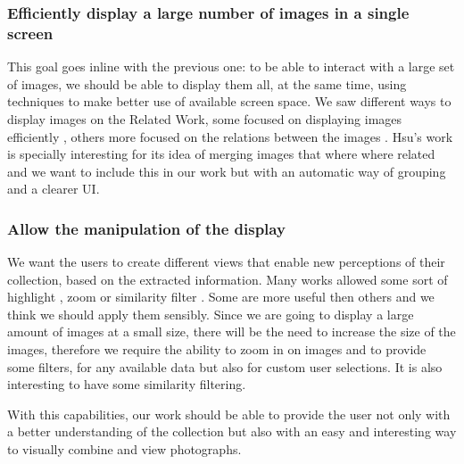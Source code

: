 \subsubsection{Efficiently display a large number of images in a single screen} %
This goal goes inline with the previous one: to be able to interact with a large set of images, we should be able to display them all, at the same time, using techniques to make better use of available screen space. We saw different ways to display images on the Related Work, some focused on displaying images efficiently \cite{Qiu:2007p1207,Rodden:2001p731,Naaman:2004p1802,Hsu:2009p2696,Bederson:2001:PZI:502348.502359}, others more focused on the relations between the images \cite{Girgensohn:2009:MOP:1502650.1502711,Heesch:2004p2675}. Hsu's work \cite{Hsu:2009p2696} is specially interesting for its idea of merging images that where where related and we want to include this in our work but with an automatic way of grouping and a clearer \ac{UI}.

\subsubsection{Allow the manipulation of the display}
We want the users to create different views that enable new perceptions of their collection, based on the extracted information. Many works allowed some sort of highlight \cite{Girgensohn:2009:MOP:1502650.1502711}, zoom \cite{Bederson:2001:PZI:502348.502359} or similarity filter \cite{Qiu:2007p1207,Heesch:2004p2675}. Some are more useful then others and we think we should apply them sensibly. Since we are going to display a large amount of images at a small size, there will be the need to increase the size of the images, therefore we require the ability to zoom in on images and to provide some filters, for any available data but also for custom user selections. It is also interesting to have some similarity filtering.
	
\vspace{\baselineskip}
	
With this capabilities, our work should be able to provide the user not only with a better understanding of the collection but also with an easy and interesting way to visually combine and view photographs.



